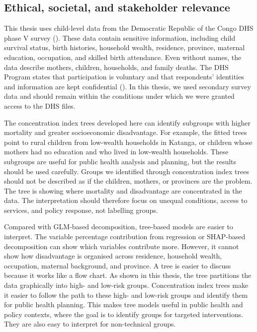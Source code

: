 \documentclass[
  11pt,
  a4paper,
]{article}
\begin{document}
\subsection{Ethical, societal, and stakeholder
relevance}\label{ethical-societal-and-stakeholder-relevance}

This thesis uses child-level data from the Democratic Republic of the
Congo DHS phase V survey (). These data contain sensitive information,
including child survival status, birth histories, household wealth,
residence, province, maternal education, occupation, and skilled birth
attendance. Even without names, the data describe mothers, children,
households, and family deaths. The DHS Program states that participation
is voluntary and that respondents' identities and information are kept
confidential (). In this thesis, we used secondary survey data and should remain
within the conditions under which we were granted access to the DHS
files.

The concentration index trees developed here can identify subgroups with
higher mortality and greater socioeconomic disadvantage. For example,
the fitted trees point to rural children from low-wealth households in
Katanga, or children whose mothers had no education and who lived in
low-wealth households. These subgroups are useful for public health
analysis and planning, but the results should be used carefully. Groups
we identified through concentration index trees should not be described
as if the children, mothers, or provinces are the problem. The tree is
showing where mortality and disadvantage are concentrated in the data.
The interpretation should therefore focus on unequal conditions, access
to services, and policy response, not labelling groups.

Compared with GLM-based decomposition, tree-based models are easier to
interpret. The variable percentage contribution from regression or
SHAP-based decomposition can show which variables contribute more.
However, it cannot show how disadvantage is organised across residence,
household wealth, occupation, maternal background, and province. A tree
is easier to discuss because it works like a flow chart. As shown in
this thesis, the tree partitions the data graphically into high- and
low-risk groups. Concentration index trees make it easier to follow the
path to these high- and low-risk groups and identify them for public
health planning. This makes tree models useful in public health and
policy contexts, where the goal is to identify groups for targeted
interventions. They are also easy to interpret for non-technical groups.
\end{document}
